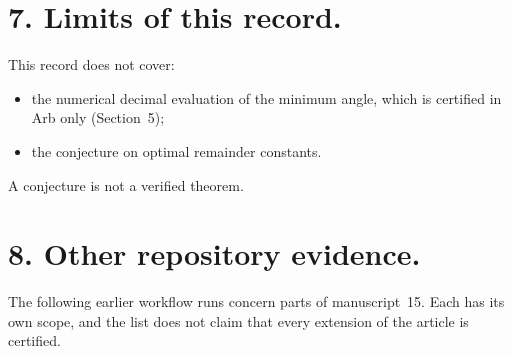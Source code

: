 \documentclass[11pt,a4paper]{article}
\begin{document}
\section*{7. Limits of this record.}
This record does not cover:
\begin{itemize}\setlength{\itemsep}{1pt}\raggedright
\item the numerical decimal evaluation of the minimum angle, which is certified in Arb only (Section~5);
\item the conjecture on optimal remainder constants.
\end{itemize}
A conjecture is not a verified theorem.

\section*{8. Other repository evidence.}
The following earlier workflow runs concern parts of manuscript~15. Each has its own scope, and the list does not claim that every extension of the article is certified.
\end{document}
